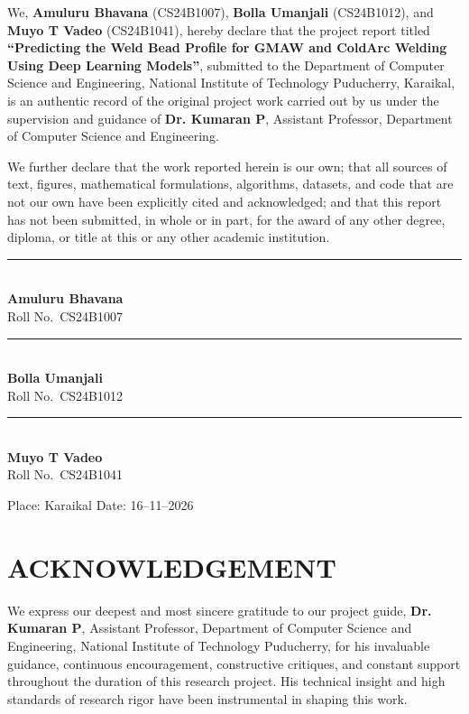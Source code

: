 \documentclass[12pt,a4paper,oneside]{report}
\newcommand{\reportTitle}{Predicting the Weld Bead Profile for GMAW and ColdArc Welding Using Deep Learning Models}
\newcommand{\studentNameA}{Amuluru Bhavana}
\newcommand{\studentRollA}{CS24B1007}
\newcommand{\studentNameB}{Bolla Umanjali}
\newcommand{\studentRollB}{CS24B1012}
\newcommand{\studentNameC}{Muyo T Vadeo}
\newcommand{\studentRollC}{CS24B1041}
\newcommand{\internalGuide}{Dr. Kumaran P}
\newcommand{\internalGuideDesig}{Assistant Professor}
\begin{document}
We, \textbf{\studentNameA} (\studentRollA), \textbf{\studentNameB} (\studentRollB), and \textbf{\studentNameC} (\studentRollC), hereby declare that the project report titled \textbf{``\reportTitle''}, submitted to the Department of Computer Science and Engineering, National Institute of Technology Puducherry, Karaikal, is an authentic record of the original project work carried out by us under the supervision and guidance of \textbf{\internalGuide}, \internalGuideDesig, Department of Computer Science and Engineering.

We further declare that the work reported herein is our own; that all sources of text, figures, mathematical formulations, algorithms, datasets, and code that are not our own have been explicitly cited and acknowledged; and that this report has not been submitted, in whole or in part, for the award of any other degree, diploma, or title at this or any other academic institution.

\vspace{25mm}
\singlespacing\noindent
\begin{minipage}[t]{0.32\textwidth}\raggedright
\rule{45mm}{0.4pt}\\
\textbf{\studentNameA}\\
Roll No.\ \studentRollA
\end{minipage}\hfill
\begin{minipage}[t]{0.32\textwidth}\raggedright
\rule{45mm}{0.4pt}\\
\textbf{\studentNameB}\\
Roll No.\ \studentRollB
\end{minipage}\hfill
\begin{minipage}[t]{0.32\textwidth}\raggedright
\rule{45mm}{0.4pt}\\
\textbf{\studentNameC}\\
Roll No.\ \studentRollC
\end{minipage}

\vspace{15mm}
\noindent Place: Karaikal \hfill Date: 16--11--2026
\onehalfspacing
\clearpage

\chapter*{\centering ACKNOWLEDGEMENT}
\vspace{6mm}

We express our deepest and most sincere gratitude to our project guide, \textbf{\internalGuide}, \internalGuideDesig, Department of Computer Science and Engineering, National Institute of Technology Puducherry, for his invaluable guidance, continuous encouragement, constructive critiques, and constant support throughout the duration of this research project. His technical insight and high standards of research rigor have been instrumental in shaping this work.
\end{document}
